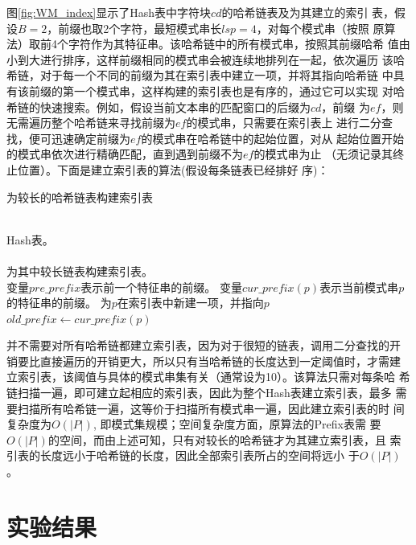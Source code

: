 图\ref{fig:WM_index}显示了Hash表中字符块$cd$的哈希链表及为其建立的索引
表，假设$B=2$，前缀也取2个字符，最短模式串长$lsp=4$，对每个模式串（按照
原算法）取前4个字符作为其特征串。该哈希链中的所有模式串，按照其前缀哈希
值由小到大进行排序，这样前缀相同的模式串会被连续地排列在一起，依次遍历
该哈希链，对于每一个不同的前缀为其在索引表中建立一项，并将其指向哈希链
中具有该前缀的第一个模式串，这样构建的索引表也是有序的，通过它可以实现
对哈希链的快速搜索。例如，假设当前文本串的匹配窗口的后缀为$cd$，前缀
为$ef$，则无需遍历整个哈希链来寻找前缀为$ef$的模式串，只需要在索引表上
进行二分查找，便可迅速确定前缀为$ef$的模式串在哈希链中的起始位置，对从
起始位置开始的模式串依次进行精确匹配，直到遇到前缀不为$ef$的模式串为止
（无须记录其终止位置）。下面是建立索引表的算法(假设每条链表已经排好
序)：

\begin{algorithm}
  \caption{为较长的哈希链表构建索引表}
  \label{alg:choose_signature}
  \begin{algorithmic}[1]
    \REQUIRE ~~\\
    Hash表。 \\
    \ENSURE ~~\\
    为其中较长链表构建索引表。\\
    \STATE
    \STATE 变量$pre\_prefix$表示前一个特征串的前缀。
    \STATE 变量$cur\_prefix(p)$表示当前模式串$p$的特征串的前缀。
    \STATE 
    \STATE 为$p$在索引表中新建一项，并指向$p$
    \STATE $old\_prefix \leftarrow cur\_prefix(p)$
    \ENDIF
    \ENDFOR
    \ENDIF
    \ENDFOR
  \end{algorithmic}
\end{algorithm}

并不需要对所有哈希链都建立索引表，因为对于很短的链表，调用二分查找的开
销要比直接遍历的开销更大，所以只有当哈希链的长度达到一定阈值时，才需建
立索引表，该阈值与具体的模式串集有关（通常设为10）。该算法只需对每条哈
希链扫描一遍，即可建立起相应的索引表，因此为整个Hash表建立索引表，最多
需要扫描所有哈希链一遍，这等价于扫描所有模式串一遍，因此建立索引表的时
间复杂度为$O(|P|)$, 即模式集规模；空间复杂度方面，原算法的Prefix表需
要$O(|P|)$的空间，而由上述可知，只有对较长的哈希链才为其建立索引表，且
索引表的长度远小于哈希链的长度，因此全部索引表所占的空间将远小
于$O(|P|)$。


\section{实验结果}
\label{sec:5_experiment}

